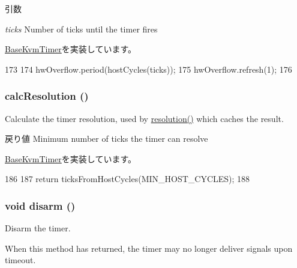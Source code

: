 \begin{DoxyParams}{引数}
\item[{\em ticks}]Number of ticks until the timer fires \end{DoxyParams}


\hyperlink{classBaseKvmTimer_af6a92c8cd2abd0bf8699cbefe1257074}{BaseKvmTimer}を実装しています。


\begin{DoxyCode}
173 {
174     hwOverflow.period(hostCycles(ticks));
175     hwOverflow.refresh(1);
176 }
\end{DoxyCode}
\hypertarget{classPerfKvmTimer_a02798cc202bebceef3ff0e3ff3d7b5b8}{
\subsubsection[{calcResolution}]{ calcResolution ()}}
\label{classPerfKvmTimer_a02798cc202bebceef3ff0e3ff3d7b5b8}
Calculate the timer resolution, used by \hyperlink{classBaseKvmTimer_a4450cc644b16fe4cb8b25ed02fb6446f}{resolution()} which caches the result.

\begin{DoxyReturn}{戻り値}
Minimum number of ticks the timer can resolve 
\end{DoxyReturn}


\hyperlink{classBaseKvmTimer_a8bff362cf60f8a6adbdc0aa31cb9be27}{BaseKvmTimer}を実装しています。


\begin{DoxyCode}
186 {
187     return ticksFromHostCycles(MIN_HOST_CYCLES);
188 }
\end{DoxyCode}
\hypertarget{classPerfKvmTimer_a9882bfa120cede575461197f2a13cd8b}{
\subsubsection[{disarm}]{\setlength{\rightskip}{0pt plus 5cm}void disarm ()}}
\label{classPerfKvmTimer_a9882bfa120cede575461197f2a13cd8b}
Disarm the timer.

When this method has returned, the timer may no longer deliver signals upon timeout. 

